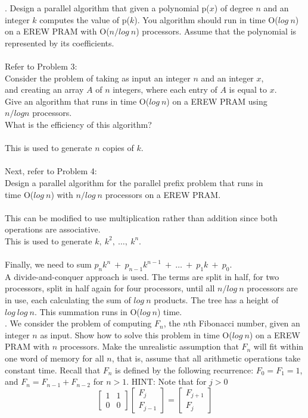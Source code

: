 \documentclass[10pt]{article}
\newcommand{\tab}{\hspace*{2em}}
\begin{document}
. Design a parallel algorithm that given a polynomial p($x$) of degree $n$ and an integer $k$ computes the value
of p($k$). You algorithm should run in time O($log~n$) on a EREW PRAM with O($n/log~n$) processors.
Assume that the polynomial is represented by its coefficients.\\
\\
Refer to Problem 3:\\
\tab Consider the problem of taking as input an integer $n$ and an integer $x$,\\
\tab and creating an array $A$ of $n$ integers, where each entry of $A$ is equal to $x$.\\
\tab Give an algorithm that runs in time O($log~n$) on a EREW PRAM using\\
\tab $n/log n$ processors.\\
\tab What is the efficiency of this algorithm?\\
\\
This is used to generate $n$ copies of $k$.\\
\\
Next, refer to Problem 4:\\
\tab Design a parallel algorithm for the parallel prefix problem that runs in\\
\tab time O($log~n$) with $n/log~n$ processors on a EREW PRAM.\\
\\
This can be modified to use multiplication rather than addition since both operations are associative.\\
This is used to generate $k,~k^2,~\ldots,~ k^n$.\\
\\
Finally, we need to sum $p_nk^n~+~p_{n-1}k^{n-1}~+~\ldots~+~p_1k~+~p_0$.\\
A divide-and-conquer approach is used. The terms are split in half, for two processors, split in half again for four processors, 
until all $n/log~n$ processors are in use, each calculating the sum of $log~n$ products. The tree has a height of $log~log~n$.
This summation runs in O($log~n$) time.\\

. We consider the problem of computing $F_n$, the $n$th Fibonacci number, given an integer $n$ as input.
Show how to solve this problem in time O($log~n$) on a EREW PRAM with $n$ processors. Make the
unrealistic assumption that $F_n$ will fit within one word of memory for all $n$, that is, assume that
all arithmetic operations take constant time. Recall that $F_n$ is defined by the following recurrence:
$F_{0} = F_{1} = 1$, and $F_{n} = F_{n-1} + F_{n-2}$ for $n > 1$.
HINT: Note that for $j > 0$
\[
\left[ \begin{array}{cc}
1 & 1\\
0 & 0
\end{array} \right]
\left[ \begin{array}{c}
F_j\\
F_{j-1}
\end{array} \right]
=
\left[ \begin{array}{c}
F_{j+1}\\
F_j
\end{array} \right]
\]
\end{document}
